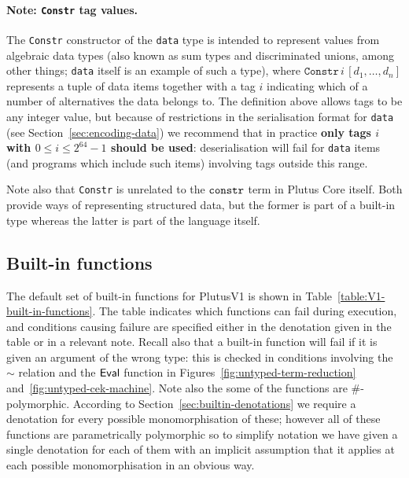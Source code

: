 \paragraph{Note: \texttt{Constr} tag values.}
\label{note:constr-tag-values}
The \texttt{Constr} constructor of the \texttt{data} type is intended to
represent values from algebraic data types (also known as sum types and
discriminated unions, among other things; \texttt{data} itself is an example of
such a type), where $\mathtt{Constr}\, i\, [d_1,\ldots,d_n]$
represents a tuple of data items together with a tag $i$ indicating which of a
number of alternatives the data belongs to.  The definition above allows tags to
be any integer value, but because of restrictions in the serialisation format
for \texttt{data} (see Section~\ref{sec:encoding-data}) we recommend that in
practice \textbf{only tags $i$ with $0 \leq i \leq 2^{64}-1$ should be used}:
deserialisation will fail for \texttt{data} items (and programs which include
such items) involving tags outside this range.

Note also that \texttt{Constr} is unrelated to the $\texttt{constr}$ term in
Plutus Core itself. Both provide ways of representing structured data, but
the former is part of a built-in type whereas the latter is part of the language
itself.

\subsection{Built-in functions}
\label{sec:V1-built-in-functions}
The default set of built-in functions for PlutusV1 is shown in
Table~\ref{table:V1-built-in-functions}.  The table indicates which
functions can fail during execution, and conditions causing failure are
specified either in the denotation given in the table or in a relevant note.
Recall also that a built-in function will fail if it is given an argument of the
wrong type: this is checked in conditions involving the $\sim$ relation and the
$\mathsf{Eval}$ function in Figures~\ref{fig:untyped-term-reduction}
and~\ref{fig:untyped-cek-machine}.  Note also the some of the functions are
\#-polymorphic.  According to Section~\ref{sec:builtin-denotations} we
require a denotation for every possible monomorphisation of these; however all
of these functions are parametrically polymorphic so to simplify notation we
have given a single denotation for each of them with an implicit assumption that
it applies at each possible monomorphisation in an obvious way.

